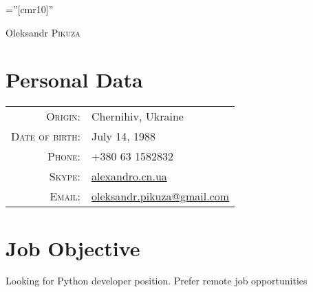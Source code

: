 \documentclass[a4paper,10pt]{article}
\begin{document}
\pagestyle{empty} %

\font\fb=''[cmr10]'' %

\par{\centering
  {\Huge Oleksandr \textsc{Pikuza}
}\bigskip\par}

\section{Personal Data}

\begin{tabular}{rl}
    \textsc{Origin:}   	& Chernihiv, Ukraine \\
    \textsc{Date of birth:}    & July 14, 1988 \\
    \textsc{Phone:}     & +380 63 1582832 \\
    \textsc{Skype:}	& \href{skype:alexandro.cn.ua}{alexandro.cn.ua} \\
    \textsc{Email:}     & \href{mailto:oleksandr.pikuza@gmail.com}{oleksandr.pikuza@gmail.com} \\
\end{tabular}

\section{Job Objective}
Looking for Python developer position. Prefer remote job opportunities


\end{document}
